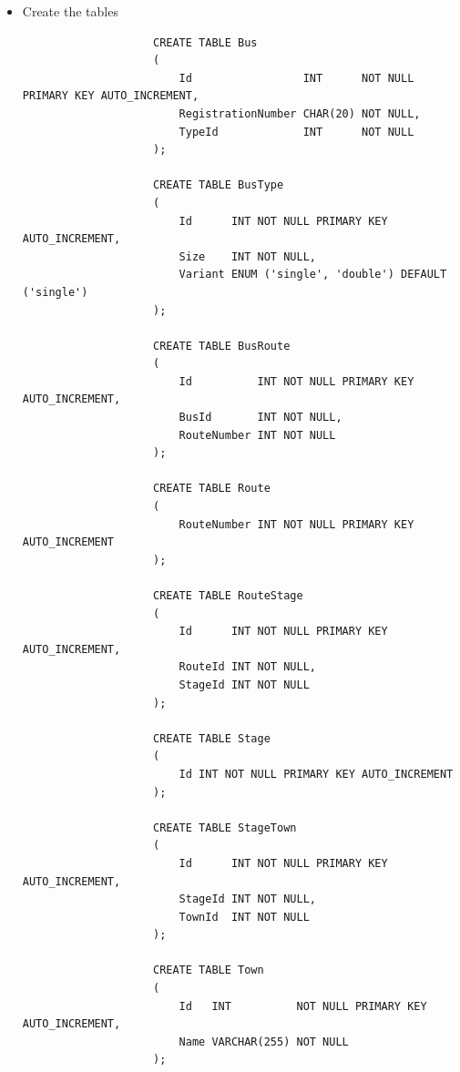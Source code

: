 \documentclass[12pt,titlepage]{article}
\begin{document}
\begin{enumerate}[label=\alph*.)]
{\begin{itemize}
{                \begin{verbatim}
                    CREATE DATABASE bus_system;
                    USE bus_system;
                \end{verbatim}
            }
            \item {
                Create the tables

                \begin{verbatim}
                    CREATE TABLE Bus
                    (
                        Id                 INT      NOT NULL PRIMARY KEY AUTO_INCREMENT,
                        RegistrationNumber CHAR(20) NOT NULL,
                        TypeId             INT      NOT NULL
                    );

                    CREATE TABLE BusType
                    (
                        Id      INT NOT NULL PRIMARY KEY AUTO_INCREMENT,
                        Size    INT NOT NULL,
                        Variant ENUM ('single', 'double') DEFAULT ('single')
                    );

                    CREATE TABLE BusRoute
                    (
                        Id          INT NOT NULL PRIMARY KEY AUTO_INCREMENT,
                        BusId       INT NOT NULL,
                        RouteNumber INT NOT NULL
                    );

                    CREATE TABLE Route
                    (
                        RouteNumber INT NOT NULL PRIMARY KEY AUTO_INCREMENT
                    );

                    CREATE TABLE RouteStage
                    (
                        Id      INT NOT NULL PRIMARY KEY AUTO_INCREMENT,
                        RouteId INT NOT NULL,
                        StageId INT NOT NULL
                    );

                    CREATE TABLE Stage
                    (
                        Id INT NOT NULL PRIMARY KEY AUTO_INCREMENT
                    );

                    CREATE TABLE StageTown
                    (
                        Id      INT NOT NULL PRIMARY KEY AUTO_INCREMENT,
                        StageId INT NOT NULL,
                        TownId  INT NOT NULL
                    );

                    CREATE TABLE Town
                    (
                        Id   INT          NOT NULL PRIMARY KEY AUTO_INCREMENT,
                        Name VARCHAR(255) NOT NULL
                    );


\end{verbatim}}
\end{itemize}}
\end{enumerate}
\end{document}
